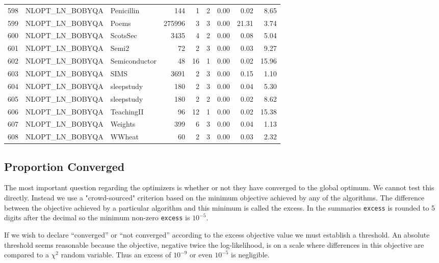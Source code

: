 \documentclass[article]{jss}
\begin{document}
\begin{table}[htbp]
\begin{tabular}{rllrrrrrr}
  598 & NLOPT\_LN\_BOBYQA & Penicillin & 144 &   1 &   2 & 0.00 & 0.02 & 8.65 \\ 
  599 & NLOPT\_LN\_BOBYQA & Poems & 275996 &   3 &   3 & 0.00 & 21.31 & 3.74 \\ 
  600 & NLOPT\_LN\_BOBYQA & ScotsSec & 3435 &   4 &   2 & 0.00 & 0.08 & 5.04 \\ 
  601 & NLOPT\_LN\_BOBYQA & Semi2 &  72 &   2 &   3 & 0.00 & 0.03 & 9.27 \\ 
  602 & NLOPT\_LN\_BOBYQA & Semiconductor &  48 &  16 &   1 & 0.00 & 0.02 & 15.96 \\ 
  603 & NLOPT\_LN\_BOBYQA & SIMS & 3691 &   2 &   3 & 0.00 & 0.15 & 1.10 \\ 
  604 & NLOPT\_LN\_BOBYQA & sleepstudy & 180 &   2 &   3 & 0.00 & 0.04 & 5.30 \\ 
  605 & NLOPT\_LN\_BOBYQA & sleepstudy & 180 &   2 &   2 & 0.00 & 0.02 & 8.62 \\ 
  606 & NLOPT\_LN\_BOBYQA & TeachingII &  96 &  12 &   1 & 0.00 & 0.02 & 15.38 \\ 
  607 & NLOPT\_LN\_BOBYQA & Weights & 399 &   6 &   3 & 0.00 & 0.04 & 1.13 \\ 
  608 & NLOPT\_LN\_BOBYQA & WWheat &  60 &   2 &   3 & 0.00 & 0.03 & 2.32 \\ 
   \hline
\end{tabular}
\end{table}







\subsection[Convergence]{Proportion Converged}



The most important question regarding the optimizers is whether or not they have converged to the global optimum. We cannot test this directly. Instead we use a "crowd-sourced" criterion based on the minimum objective achieved by any of the algorithms. The difference between the objective achieved by a particular algorithm and this minimum is called the excess. In the summaries \texttt{excess} is rounded to 5 digits after the decimal so the minimum non-zero \texttt{excess} is $10^{-5}$.





  If we wish to declare ``converged'' or ``not converged'' according to
the excess objective value we must establish a threshold. An absolute
threshold seems reasonable because the objective, negative twice the
log-likelihood, is on a scale where differences in this objective are
compared to a $\chi^2$ random variable. Thus an excess of $10^{-9}$ or
even $10^{-5}$ is negligible.
\end{document}
